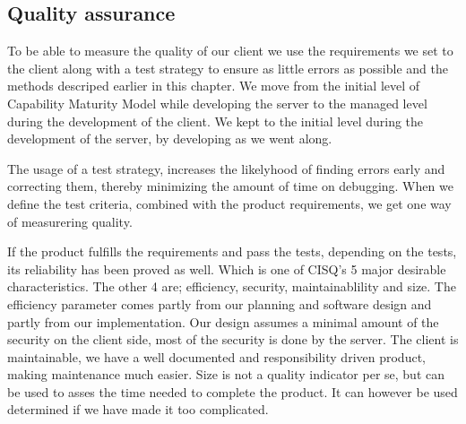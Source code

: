 \subsection{Quality assurance}
To be able to measure the quality of our client we use the requirements we set to the client along with a test strategy to ensure as little errors as possible and the methods descriped earlier in this chapter. We move from the initial level of Capability Maturity Model while developing the server to the managed level during the development of the client. We kept to the initial level during the development of the server, by developing as we went along.

The usage of a test strategy, increases the likelyhood of finding errors early and correcting them, thereby minimizing the amount of time on debugging. When we define the test criteria, combined with the product requirements, we get one way of measurering quality.

 If the product fulfills the requirements and pass the tests, depending on the tests, its reliability has been proved as well. Which is one of CISQ's 5 major desirable characteristics. The other 4 are; efficiency, security, maintainablility and size. The efficiency parameter comes partly from our planning and software design and partly from our implementation.
 Our design assumes a minimal amount of the security on the client side, most of the security is done by the server.
 The client is maintainable, we have a well documented and responsibility driven product, making maintenance much easier. 
 Size is not a quality indicator per se, but can be used to asses the time needed to complete the product. It can however be used determined if we have made it too complicated.
 
